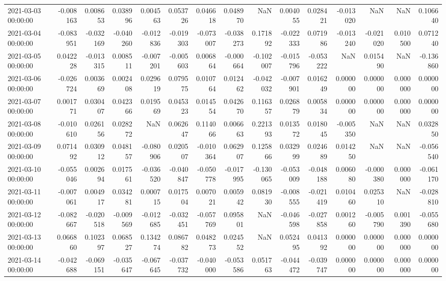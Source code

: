 \begin{tabular}{lrrrrrrrrrrrrrr}
2021-03-03 00:00:00 & -0.008163 & 0.008653 & 0.038996 & 0.004563 & 0.053726 & 0.046618 & 0.048970 & NaN & 0.004055 & 0.028421 & -0.013020 & NaN & NaN & 0.106640 \\
2021-03-04 00:00:00 & -0.083951 & -0.032169 & -0.040260 & -0.012836 & -0.019303 & -0.073007 & -0.038273 & 0.171892 & -0.022333 & 0.071986 & -0.013240 & -0.021020 & 0.010500 & 0.071240 \\
2021-03-05 00:00:00 & 0.042228 & -0.013315 & 0.008511 & -0.007201 & -0.005603 & 0.006864 & -0.000664 & -0.102007 & -0.015796 & -0.053222 & NaN & 0.015490 & NaN & -0.136860 \\
2021-03-06 00:00:00 & -0.026724 & 0.003669 & 0.002408 & 0.029619 & 0.079575 & 0.010764 & 0.012462 & -0.042032 & -0.007901 & 0.016249 & 0.000000 & 0.000000 & 0.000000 & 0.000000 \\
2021-03-07 00:00:00 & 0.001771 & 0.030407 & 0.042366 & 0.019569 & 0.045323 & 0.014554 & 0.042670 & 0.116357 & 0.026879 & 0.005834 & 0.000000 & 0.000000 & 0.000000 & 0.000000 \\
2021-03-08 00:00:00 & -0.010610 & 0.026156 & 0.028272 & NaN & 0.062647 & 0.114066 & 0.006663 & 0.221393 & 0.013572 & 0.018045 & -0.005350 & NaN & NaN & 0.032850 \\
2021-03-09 00:00:00 & 0.071492 & 0.030912 & 0.048157 & -0.080906 & 0.020507 & -0.010364 & 0.062907 & 0.125866 & 0.032999 & 0.024689 & 0.014250 & NaN & NaN & -0.056540 \\
2021-03-10 00:00:00 & -0.055046 & 0.002694 & 0.017561 & -0.036520 & -0.040847 & -0.050778 & -0.017995 & -0.130065 & -0.053009 & -0.048188 & 0.006080 & -0.000380 & 0.000000 & -0.061170 \\
2021-03-11 00:00:00 & -0.007061 & 0.004917 & 0.034281 & 0.000715 & 0.017504 & 0.007021 & 0.005942 & 0.081930 & -0.008555 & -0.021419 & 0.010460 & 0.025310 & NaN & -0.028810 \\
2021-03-12 00:00:00 & -0.082667 & -0.020518 & -0.009569 & -0.012685 & -0.032451 & -0.057769 & 0.095801 & NaN & -0.046598 & -0.027858 & 0.001260 & -0.005790 & 0.001390 & -0.055680 \\
2021-03-13 00:00:00 & 0.066860 & 0.102397 & 0.068527 & 0.134274 & 0.086782 & 0.048273 & 0.024552 & NaN & 0.052495 & 0.041392 & 0.000000 & 0.000000 & 0.000000 & 0.000000 \\
2021-03-14 00:00:00 & -0.042688 & -0.069151 & -0.035647 & -0.067645 & -0.037732 & -0.040000 & -0.053586 & 0.051763 & -0.044472 & -0.039747 & 0.000000 & 0.000000 & 0.000000 & 0.000000 \\

\end{tabular}

